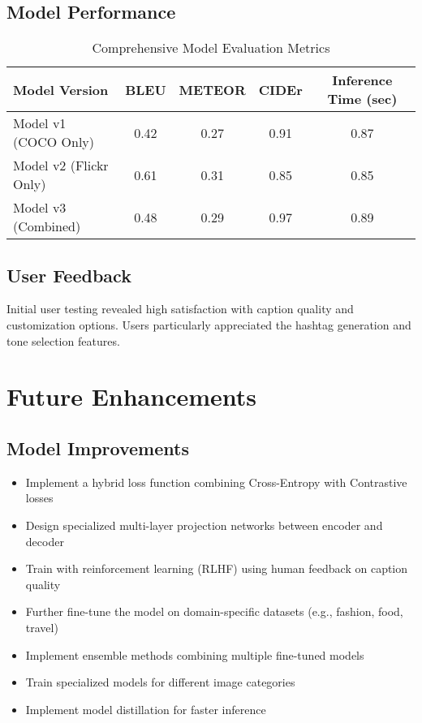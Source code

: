 \documentclass[12pt,a4paper]{report}
\begin{document}
\section{Model Performance}
\begin{table}[h]
\centering
\begin{tabular}{lcccc}
\toprule
\textbf{Model Version} & \textbf{BLEU} & \textbf{METEOR} & \textbf{CIDEr} & \textbf{Inference Time (sec)} \\
\midrule
Model v1 (COCO Only) & 0.42 & 0.27 & 0.91 & 0.87 \\
Model v2 (Flickr Only) & 0.61 & 0.31 & 0.85 & 0.85 \\
Model v3 (Combined) & 0.48 & 0.29 & 0.97 & 0.89 \\
\bottomrule
\end{tabular}
\caption{Comprehensive Model Evaluation Metrics}
\label{tab:model_metrics}
\end{table}

\section{User Feedback}
Initial user testing revealed high satisfaction with caption quality and customization options. Users particularly appreciated the hashtag generation and tone selection features.

\chapter{Future Enhancements}
\section{Model Improvements}
\begin{itemize}
    \item Implement a hybrid loss function combining Cross-Entropy with Contrastive losses
    \item Design specialized multi-layer projection networks between encoder and decoder
    \item Train with reinforcement learning (RLHF) using human feedback on caption quality
    \item Further fine-tune the model on domain-specific datasets (e.g., fashion, food, travel)
    \item Implement ensemble methods combining multiple fine-tuned models
    \item Train specialized models for different image categories
    \item Implement model distillation for faster inference
\end{itemize}
\end{document}
